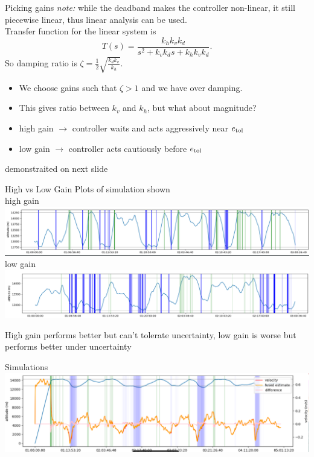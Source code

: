 \documentclass[10pt,mathserif]{beamer}
\begin{document}


\begin{frame}{Picking gains}
\emph{note:} while the deadband makes the controller non-linear, it still piecewise linear, thus linear analysis can be used.\\
Transfer function for the linear system is\\
\[T(s) = \frac{k_h k_v k_d}{s^2 + k_v k_d s + k_h k_v k_d}.\]
So damping ratio is $\zeta = \frac{1}{2}\sqrt{\frac{k_d k_v}{k_h}}$. 
\begin{itemize}
\item We choose gains such that $\zeta > 1$ and we have over damping.
\item This gives ratio between $k_v$ and $k_h$, but what about magnitude?
\item high gain $\to$ controller waits and acts aggressively near $e_{\mathrm{tol}}$
\item low gain $\to$ controller acts cautiously before $e_{\mathrm{tol}}$
\end{itemize}
demonstraited on next slide
\end{frame}

\begin{frame}{High vs Low Gain}
Plots of simulation shown\\
high gain
\includegraphics[width=\linewidth,trim={0 5 0 0cm},clip]{highgainsim.png}
\vspace{.05cm}\\
low gain
\includegraphics[width=\linewidth,trim={0 0 0 0cm},clip]{lowgainsim.png}

High gain performs better but can't tolerate uncertainty, low gain is worse but performs better under uncertainty
\end{frame}

\begin{frame}{Simulations}
\includegraphics[width=1\linewidth]{lsim.png}
\end{frame}
\end{document}

